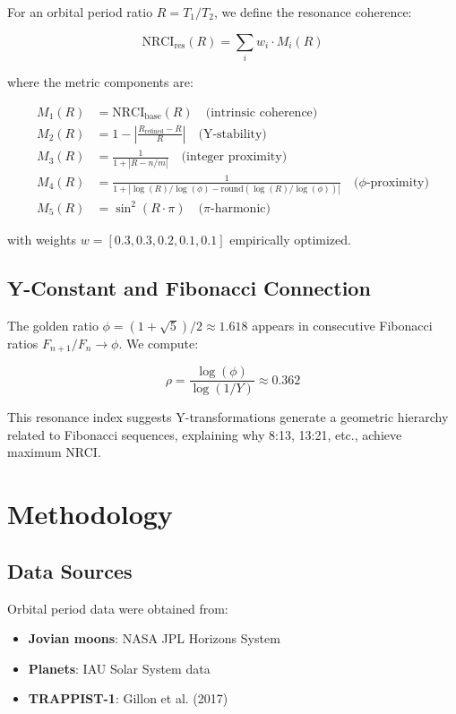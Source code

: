 \documentclass[12pt,a4paper]{article}
\begin{document}
For an orbital period ratio $R = T_1 / T_2$, we define the resonance coherence:

\begin{equation}
\text{NRCI}_{\text{res}}(R) = \sum_{i} w_i \cdot M_i(R)
\end{equation}

where the metric components are:

\begin{align}
M_1(R) &= \text{NRCI}_{\text{base}}(R) \quad \text{(intrinsic coherence)} \\
M_2(R) &= 1 - \left|\frac{R_{\text{refined}} - R}{R}\right| \quad \text{(Y-stability)} \\
M_3(R) &= \frac{1}{1 + |R - n/m|} \quad \text{(integer proximity)} \\
M_4(R) &= \frac{1}{1 + |\log(R)/\log(\phi) - \text{round}(\log(R)/\log(\phi))|} \quad \text{($\phi$-proximity)} \\
M_5(R) &= \sin^2(R \cdot \pi) \quad \text{($\pi$-harmonic)}
\end{align}

with weights $w = [0.3, 0.3, 0.2, 0.1, 0.1]$ empirically optimized.

\subsection{Y-Constant and Fibonacci Connection}

The golden ratio $\phi = (1 + \sqrt{5})/2 \approx 1.618$ appears in consecutive Fibonacci ratios $F_{n+1}/F_n \rightarrow \phi$. We compute:

\begin{equation}
\rho = \frac{\log(\phi)}{\log(1/Y)} \approx 0.362
\end{equation}

This resonance index suggests Y-transformations generate a geometric hierarchy related to Fibonacci sequences, explaining why 8:13, 13:21, etc., achieve maximum NRCI.

\section{Methodology}

\subsection{Data Sources}

Orbital period data were obtained from:
\begin{itemize}
\item \textbf{Jovian moons}: NASA JPL Horizons System
\item \textbf{Planets}: IAU Solar System data
\item \textbf{TRAPPIST-1}: Gillon et al. (2017) \cite{gillon2017}
\end{itemize}
\end{document}
